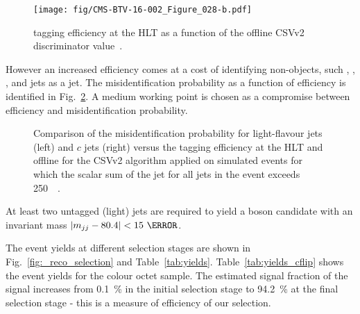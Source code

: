 \begin{figure}[hbtp]
\centering
\texttt{[image: fig/CMS-BTV-16-002\_Figure\_028-b.pdf]}
\caption{\cPqb tagging efficiency at the HLT as a function of the offline CSVv2 discriminator value~\cite{Sirunyan:2017ezt}.}
\label{fig:CMS-BTV-16-002_Figure_028-b}
\end{figure}

However an increased efficiency comes at a cost of identifying non-\cPqb objects, such \cPqc, \cPqs, \cPqu, \cPqd and \Pg jets as a \cPqb jet. The misidentification probability as a function of efficiency is identified in Fig.~\ref{fig:CMS-BTV-16-002_Figure_029}. A medium working point is chosen as a compromise between efficiency and misidentification probability.

\begin{figure}[hbtp]
\centering
  \def\twidth{0.45}
  \centering
  \hfil
\caption{Comparison of the misidentification probability for light-flavour jets (left) and $c$ jets (right) versus the \cPqb tagging efficiency at the HLT and offline for the CSVv2 algorithm applied on simulated \ttbar events for which the scalar sum of the jet \pt for all jets in the event exceeds 250~\GeV~\cite{Sirunyan:2017ezt}.}
\label{fig:CMS-BTV-16-002_Figure_029}
\end{figure}

At least two untagged (light) jets are required to yield a \PW boson candidate with an invariant mass $\left|m_{jj}-80.4\right|<15~\GeV$.

The event yields at different selection stages are shown in Fig.~\ref{fig:_reco_selection} and Table~\ref{tab:yields}. Table~\ref{tab:yields_cflip} shows the event yields for the colour octet \PW sample. The estimated signal fraction of the signal increases from 0.1~\% in the initial selection stage to 94.2~\% at the final selection stage - this is a measure of efficiency of our selection.


